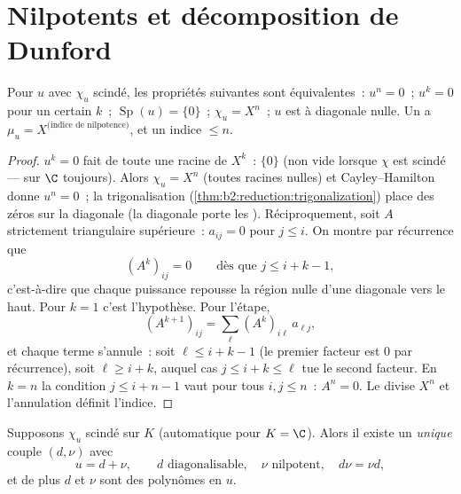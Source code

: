 \section{Nilpotents et décomposition de Dunford}

\begin{proposition}\label{prop:b2:reduction:nilpotent}
Pour $u$ avec $\chi_u$ scindé, les propriétés suivantes sont
équivalentes~: $u^n = 0$~; $u^k = 0$ pour un certain $k$~;
$\operatorname{Sp}(u) = \{0\}$~; $\chi_u = X^n$~; $u$ est
 à diagonale nulle. Un  a $\mu_u
= X^{\text{(indice de nilpotence)}}$, et un indice $\leq
n$.
\end{proposition}

\begin{proof}
$u^k = 0$ fait de toute  une racine de $X^k$~: 
$\{0\}$ (non vide lorsque $\chi$ est scindé --- sur $\C$ toujours).
Alors $\chi_u = X^n$ (toutes racines nulles) et Cayley--Hamilton donne
$u^n = 0$~; la trigonalisation
(\cref{thm:b2:reduction:trigonalization}) place des zéros sur la
diagonale (la diagonale porte les ). Réciproquement,
soit $A$ strictement triangulaire supérieure~: $a_{ij} = 0$ pour $j
\leq i$. On montre par récurrence que
\[
(A^k)_{ij} = 0 \qquad \text{dès que } j \leq i + k - 1,
\]
c'est-à-dire que chaque puissance repousse la région nulle d'une
diagonale vers le haut. Pour $k = 1$ c'est l'hypothèse. Pour l'étape,
\[
(A^{k+1})_{ij} = \sum_{\ell} (A^k)_{i\ell}\,a_{\ell j} ,
\]
et chaque terme s'annule~: soit $\ell \leq i + k - 1$ (le premier
facteur est $0$ par récurrence), soit $\ell \geq i + k$, auquel cas $j
\leq i + k \leq \ell$ tue le second facteur. En $k = n$ la condition
$j \leq i + n - 1$ vaut pour tous $i, j \leq n$~: $A^n = 0$. Le
 divise $X^n$ et l'annulation définit l'indice.
\end{proof}

\begin{theorem}\label{thm:b2:reduction:dunford}
Supposons $\chi_u$ scindé sur $K$ (automatique pour $K = \C$). Alors
il existe un \emph{unique} couple $(d, \nu)$ avec
\[
u = d + \nu, \qquad d \text{ diagonalisable}, \quad \nu
\text{ nilpotent}, \quad d\nu = \nu d ,
\]
et de plus $d$ et $\nu$ sont des polynômes en $u$.
\end{theorem}

